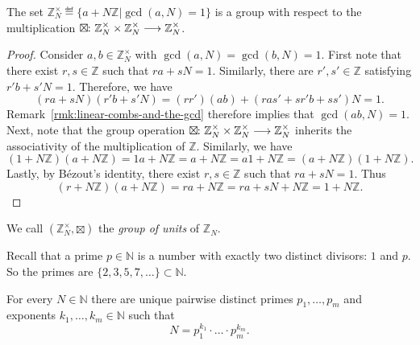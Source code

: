 \documentclass[a4paper, oneside, 12pt]{amsart}
\begin{document}
\begin{lemma}\label{lem:group-of-units}
  The set \(\mathbb{Z}_N^\times \eqdef \{ a + N\mathbb{Z} |\gcd(a, N) = 1 \}\) is a group with respect to the multiplication \( \boxtimes \from \mathbb{Z}_N^\times \times \mathbb{Z}_N^\times \to \mathbb{Z}_N^\times \).
\end{lemma}
\begin{proof}
  Consider \( a, b \in \mathbb{Z}_N^\times \) with \( \gcd(a, N) = \gcd(b, N) = 1 \).
  First note that  there exist \( r, s \in \mathbb{Z} \) such that \( ra + sN = 1 \). Similarly, there are \( r', s' \in \mathbb{Z} \) satisfying \( r'b + s'N = 1 \).
  Therefore, we have
  \begin{equation*}
    (ra + sN)(r'b + s'N) = (rr')(ab) + (ras'+ sr'b + ss')N = 1.
  \end{equation*}
  Remark~\ref{rmk:linear-combs-and-the-gcd} therefore implies that \(\gcd(ab,N) = 1\).
  Next, note that the group operation \(\boxtimes \from \mathbb{Z}_{N}^{\times} \times \mathbb{Z}_{N}^{\times} \to \mathbb{Z}_{N}^{\times}\) inherits the  associativity of the multiplication of \( \mathbb{Z}\).
  Similarly, we have
  \begin{equation*}
    (1+ N \mathbb{Z})(a + N \mathbb{Z}) = 1a + N \mathbb{Z} = a + N \mathbb{Z} = a1 + N \mathbb{Z} = (a + N \mathbb{Z})(1 + N \mathbb{Z}).
  \end{equation*}
  Lastly, by Bézout's identity, there exist \( r, s \in \mathbb{Z} \) such that \( ra + sN = 1 \).
  Thus
  \begin{equation*}
    (r+ N \mathbb{Z}) (a + N \mathbb{Z}) = ra + N \mathbb{Z} = ra+ sN + N \mathbb{Z} = 1 + N \mathbb{Z}.
  \end{equation*}
\end{proof}

\begin{definition}\label{def:group-of-units}
  We call \( (\mathbb{Z}_N^\times, \boxtimes) \) the \emph{group of units} of \( \mathbb{Z}_N \).
\end{definition}


Recall that a prime \(p\in \mathbb{N}\) is a number with exactly two distinct divisors: \(1\) and \(p\).
So the primes are \(\{ 2, 3, 5, 7,\dots  \}\subset \mathbb{N}\).

\begin{proposition}\label{prop:prime-factorisation}
  For every \(N \in \mathbb{N}\) there are unique pairwise distinct primes \(p_{1}, \dots , p_{m}\) and exponents \(k_{1}, \dots , k_{m}\in \mathbb{N}\) such that
  \begin{equation*}
    N= p_{1}^{k_{1}}\cdot \dots \cdot p_{m}^{k_{m}}.
  \end{equation*}
\end{proposition}
\end{document}

